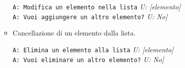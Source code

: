 \begin{itemize}
\begin{itemize}
		\texttt{A: Modifica un elemento nella lista}
		\textit{U: [elemento]}\\
		\texttt{A: Vuoi aggiungere un altro elemento?}
		\textit{U: No]}\\
		
		\item Cancellazione di un elemento dalla lista.

		
	    \texttt{A: Elimina un elemento alla lista}
		\textit{U: [elemento]}\\
		\texttt{A: Vuoi eliminare un altro elemento?}
		\textit{U: No]}\\
		

\end{itemize}
\end{itemize}

